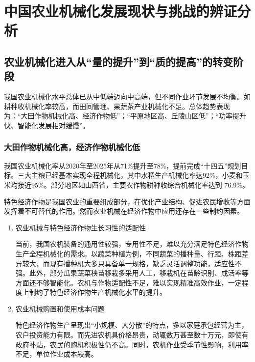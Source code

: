\documentclass[12pt,fontset=windows,titlepage]{ctexart}
\begin{document}
	\section{中国农业机械化发展现状与挑战的辨证分析}

	\subsection{农业机械化进入从“量的提升”到“质的提高”的转变阶段}

	\setcounter{cnt}{0}

	我国农业机械化水平总体已从中低端迈向中高端，但不同作业环节发展不均衡。如耕种收机械化率较高，而田间管理、果蔬茶产业机械化不足。总体趋势表现为：\li“大田作物机械化高、经济作物低”；\li	“平原地区高、丘陵山区低”；\li	“功率提升快、智能化发展相对缓慢”。

	\subsubsection{大田作物机械化高，经济作物机械化低}

	我国农业机械化率从2020年至2025年从71\%提升至78\%，提前完成“十四五”规划目标。三大主粮已经基本实现全程机械化，其中水稻生产机械化率达92\%，小麦和玉米均接近95\%\autocite{ZhouBiHuiXianDaiHuaNongYeJiJieZhuTuiNongCunJingJiFaZhanDeLuJingYiGuiLinShiLinGuiQuWeiLi2025}。部分地区如山西省，主要农作物耕种收综合机械化率达到 76.9\%\autocite{LiangYaoHuaWoShengZhuYaoNongZuoWuGengZhongShouZongHeJiJieHuaLuDaDao7692025}。

	特色经济作物是我国农业的重要组成部分，在优化产业结构、促进农民增收等方面发挥着不可替代的作用。然而农业机械在经济作物中应用还存在一些制约因素。

	\begin{enumerate}
		\item 农业机械与特色经济作物生长习性的适配性
		
		当前，我国农机装备的通用性较强，专用性不足，难以充分满足特色经济作物生产全程机械化的需求。以蔬菜种植为例，不同蔬菜的播种量、行距、株距差异较大，而现有播种机大多只具备单一规格，缺乏灵活调整功能，适应性不强。此外，部分瓜果蔬菜秧苗移栽多采用人工，移栽机在苗龄识别、成活率等方面还不够智能化。农机与作物适配性不足，难以实现精准高效作业，一定程度上制约了特色经济作物生产机械化水平的提升。

		\item 农业机械购置和使用成本问题
		
		特色经济作物生产呈现出“小规模、大分散”的特点，多以家庭承包经营为主，农户投资能力有限。而先进农机具价格昂贵，动辄数万甚至数十万元，即使有政府补贴，农民的购机积极性仍不高。同时，农机作业受季节性影响，利用率不足，单位作业成本较高\autocite{ZhengXuYanNongYeJiJieZaiTeSeJingJiZuoWuZhongZhiZhongDeYingYongJiFaZhanYanJiu2025}。

	\end{enumerate}
\end{document}
